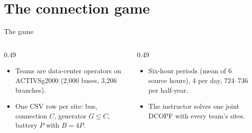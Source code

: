 \documentclass[aspectratio=169,11pt]{beamer}
\begin{document}
\section{The connection game}

\begin{frame}{The game}
  \small
  \begin{columns}[T,onlytextwidth]
    \begin{column}{0.49\textwidth}
      \begin{itemize}
        \item Teams are data-center operators on ACTIVSg2000
          (2{,}000 buses, 3{,}206 branches).
        \item One CSV row per site: bus, connection $C$, generator $G\le C$,
          battery $P$ with $B=4P$.
      \end{itemize}
    \end{column}
    \begin{column}{0.49\textwidth}
      \begin{itemize}
        \item Six-hour periods (mean of 6 source hours), 4 per day,
          724--736 per half-year.
        \item The instructor solves one joint DCOPF with every team's sites.
      \end{itemize}
    \end{column}
  \end{columns}
  \vspace{0.6em}
  \centering
  \resizebox{0.84\textwidth}{!}{}
\end{frame}
\end{document}

